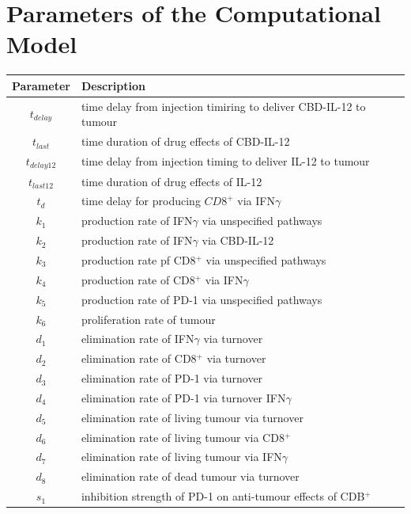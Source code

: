 \documentclass[11pt]{article}
\begin{document}
\section{Parameters of the Computational Model}
\begin{table}[!h]
    \centering
    \begin{tabular}{c |l}
        Parameter & Description \\ \hline
        $t_{delay}$ & time delay from injection timiring to deliver CBD-IL-12 to tumour \\ 
        $t_{last}$ & time duration of drug effects of CBD-IL-12 \\ 
        $t_{delay12}$ & time delay from injection timing to deliver IL-12 to tumour \\
        $t_{last12}$ & time duration of drug effects of IL-12 \\ 
        $t_d$ & time delay for producing $CD8^+$ via IFN$\gamma$ \\ \hdashline
        $k_1$ & production rate of IFN$\gamma$ via unspecified pathways \\ 
        $k_2$ & production rate of IFN$\gamma$ via CBD-IL-12 \\ 
        $k_3$ & production rate pf CD8$^+$ via unspecified pathways \\ 
        $k_4$ & production rate of CD8$^+$ via IFN$\gamma$ \\ 
        $k_5$ & production rate of PD-1 via unspecified pathways \\ 
        $k_6$ & proliferation rate of tumour \\ \hdashline
        $d_1$ & elimination rate of IFN$\gamma$ via turnover \\
        $d_2$ & elimination rate of CD8$^+$ via turnover \\ 
        $d_3$ & elimination rate of PD-1 via turnover  \\ 
        $d_4$ & elimination rate of PD-1 via turnover IFN$\gamma$ \\ 
        $d_5$ & elimination rate of living tumour via turnover \\ 
        $d_6$ & elimination rate of living tumour via CD8$^+$ \\ 
        $d_7$ & elimination rate of living tumour via IFN$\gamma$ \\ 
        $d_8$ & elimination rate of dead tumour via turnover \\\hdashline
        $s_1$ & inhibition strength of PD-1 on anti-tumour effects of CDB$^+$
    \end{tabular}
\end{table}

\clearpage
\newpage



\end{document}
